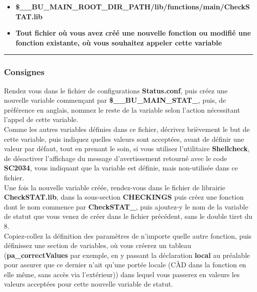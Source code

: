 \documentclass[a4paper,10pt]{article}
\begin{document}
\begin{itemize}
    \item \textbf{\color{orange}\$\_\_BU\_MAIN\_ROOT\_DIR\_PATH\color{lime}/lib/functions/main/CheckSTAT.lib}\\[1\baselineskip]

    \item \textbf{Tout fichier où vous avez créé une nouvelle fonction ou modifié une fonction existante, où vous souhaitez appeler cette variable}\\[1\baselineskip]
\end{itemize}



\color{blue}\par\noindent\rule{\textwidth}{0.4pt}\color{white}

\color{blue}
\subsubsection{Consignes}\color{white}

Rendez vous dans le fichier de configurations \textbf{\color{lime}Status.conf}, puis créez une nouvelle variable commençant par \textbf{\color{orange}\$\_\_BU\_MAIN\_STAT\_}, puis, de préférence en anglais, nommez le reste de la variable selon l'action nécessitant l'appel de cette variable.\\[1\baselineskip]

Comme les autres variables définies dans ce fichier, décrivez brièvement le but de cette variable, puis indiquez quelles valeurs sont acceptées, avant de définir une valeur par défaut, tout en prenant le soin, si vous utilisez l'utilitaire \textbf{\color{gray}Shellcheck}, de désactiver l'affichage du message d'avertissement retourné avec le code \textbf{SC2034}, vous indiquant que la variable est définie, mais non-utilisée dans ce fichier.\\[1\baselineskip]

Une fois la nouvelle variable créée, rendez-vous dans le fichier de librairie \textbf{\color{lime}CheckSTAT.lib}, dans la sous-section \textbf{CHECKINGS} puis créez une fonction dont le nom commence par \textbf{\color{mauve}CheckSTAT\_}, puis ajoutez-y le nom de la variable de statut que vous venez de créer dans le fichier précédent, sans le double tiret du 8.\\[1\baselineskip]

Copiez-collez la définition des paramètres de n'importe quelle autre fonction, puis définissez une section de variables, où vous créerez un tableau (\textbf{pa\_correctValues} par exemple, en y passant la déclaration \textbf{\color{gray}local} au préalable pour assurer que ce dernier n'ait qu'une portée locale (CÀD dans la fonction en elle même, sans accès via l'extérieur)) dans lequel vous passerez en valeurs les valeurs acceptées pour cette nouvelle variable de statut.\\[1\baselineskip]
\end{document}
